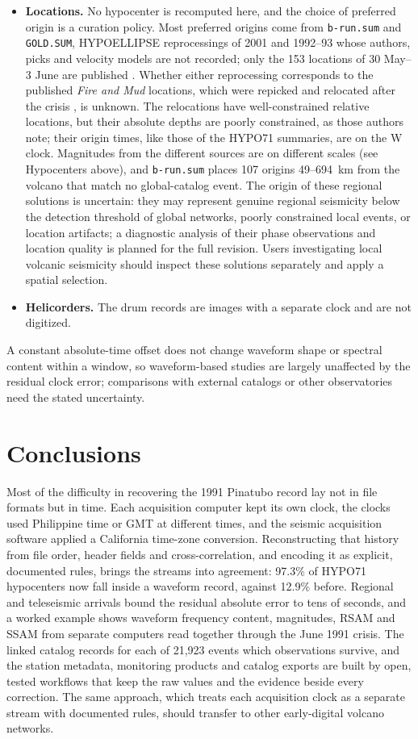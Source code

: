 \documentclass[linenum]{SSA-SRL}
\newcommand{\file}[1]{\texttt{#1}}
\begin{document}
\begin{itemize}
\item \textbf{Locations.} No hypocenter is recomputed here, and the choice of preferred origin is a curation policy. Most preferred origins come from \file{b-run.sum} and \file{GOLD.SUM}, HYPOELLIPSE reprocessings of 2001 and 1992--93 whose authors, picks and velocity models are not recorded; only the 153 locations of 30 May--3 June are published \citep{Jones_2001}. Whether either reprocessing corresponds to the published \textit{Fire and Mud} locations, which were repicked and relocated after the crisis \citep{Harlow_1996,Mori_1996b}, is unknown. The \citet{Jones_2001} relocations have well-constrained relative locations, but their absolute depths are poorly constrained, as those authors note; their origin times, like those of the HYPO71 summaries, are on the W clock. Magnitudes from the different sources are on different scales (see Hypocenters above), and \file{b-run.sum} places 107 origins 49--694~km from the volcano that match no global-catalog event. The origin of these regional solutions is uncertain: they may represent genuine regional seismicity below the detection threshold of global networks, poorly constrained local events, or location artifacts; a diagnostic analysis of their phase observations and location quality is planned for the full revision. Users investigating local volcanic seismicity should inspect these solutions separately and apply a spatial selection.
\item \textbf{Helicorders.} The drum records are images with a separate clock and are not digitized.
\end{itemize}
A constant absolute-time offset does not change waveform shape or spectral content within a window, so waveform-based studies are largely unaffected by the residual clock error; comparisons with external catalogs or other observatories need the stated uncertainty.

\section{Conclusions}

Most of the difficulty in recovering the 1991 Pinatubo record lay not in file formats but in time. Each acquisition computer kept its own clock, the clocks used Philippine time or GMT at different times, and the seismic acquisition software applied a California time-zone conversion. Reconstructing that history from file order, header fields and cross-correlation, and encoding it as explicit, documented rules, brings the streams into agreement: 97.3\% of HYPO71 hypocenters now fall inside a waveform record, against 12.9\% before. Regional and teleseismic arrivals bound the residual absolute error to tens of seconds, and a worked example shows waveform frequency content, magnitudes, RSAM and SSAM from separate computers read together through the June 1991 crisis. The linked catalog records for each of 21,923 events which observations survive, and the station metadata, monitoring products and catalog exports are built by open, tested workflows that keep the raw values and the evidence beside every correction. The same approach, which treats each acquisition clock as a separate stream with documented rules, should transfer to other early-digital volcano networks.
\end{document}
